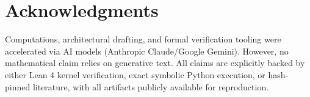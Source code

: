 \section*{Acknowledgments}

Computations, architectural drafting, and formal verification tooling were
accelerated via AI models (Anthropic Claude/Google Gemini). However, no
mathematical claim relies on generative text. All claims are explicitly
backed by either Lean 4 kernel verification, exact symbolic Python execution,
or hash-pinned literature, with all artifacts publicly available for
reproduction.

